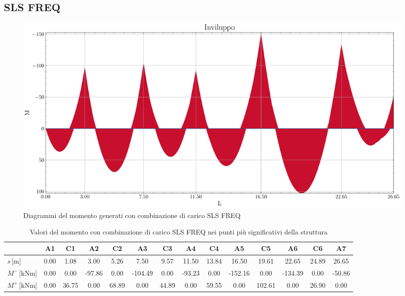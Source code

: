 \begin{landscape}
\subsection{SLS FREQ}
\begin{figure}[H]
\centering
\includegraphics[height=0.6\textwidth]{IMG/diagrammi_trave/SLS_FREQ_M.pdf}
\caption{Diagrammi del momento generati con combinazione di carico SLS FREQ}
\label{fig:trave_SLS_FREQ_momento}
\end{figure}
\begin{table}[H]
\footnotesize
\centering
\caption{Valori del momento con combinazione di carico SLS FREQ nei punti più significativi della struttura}
\label{tab:trave_SLS_FREQ_momento}
	\begin{tabular}{lS[table-format=-3.2]S[table-format=-3.2]S[table-format=-3.2]S[table-format=-3.2]S[table-format=-3.2]S[table-format=-3.2]S[table-format=-3.2]S[table-format=-3.2]S[table-format=-3.2]S[table-format=-3.2]S[table-format=-3.2]S[table-format=-3.2]S[table-format=-3.2]}
		\toprule
		{} & {A1} & {C1} & {A2} & {C2} & {A3} & {C3} & {A4} & {C4} & {A5} & {C5} & {A6} & {C6} & {A7} \\
		\midrule
		$s\,\si{[\metre]}$ & 0.00 & 1.08 & 3.00 & 5.26 & 7.50 & 9.57 & 11.50 & 13.84 & 16.50 & 19.61 & 22.65 & 24.89 & 26.65 \\
        $M^{-}\,\si{[\kilo\newton\metre]}$ & 0.00 & 0.00 & -97.86 & 0.00 & -104.49 & 0.00 & -93.23 & 0.00 & -152.16 & 0.00 & -134.39 & 0.00 & -50.86 \\
        $M^{+}\,\si{[\kilo\newton\metre]}$ & 0.00 & 36.75 & 0.00 & 68.89 & 0.00 & 44.89 & 0.00 & 59.55 & 0.00 & 102.61 & 0.00 & 26.90 & 0.00 \\
		\bottomrule
	\end{tabular}
\end{table}
\clearpage

\end{landscape}
